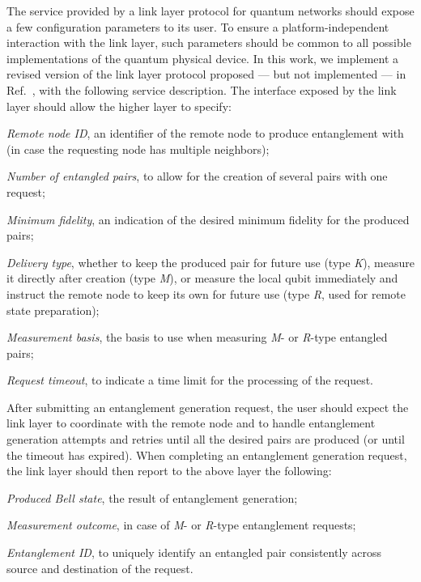 The service provided by a link layer protocol for quantum networks should expose a few configuration
parameters to its user. To ensure a platform-independent interaction with the link layer, such
parameters should be common to all possible implementations of the quantum physical device. In this
work, we implement a revised version of the link layer protocol proposed --- but not implemented ---
in Ref.~\cite{dahlberg_2019_egp}, with the following service description. The interface exposed by
the link layer should allow the higher layer to specify:
%
\begin{inlinelist}
    \item \emph{Remote node ID}, an identifier of the remote node to produce entanglement with (in
          case the requesting node has multiple neighbors);
    \item \emph{Number of entangled pairs}, to allow for the creation of several pairs with one
          request;
    \item \emph{Minimum fidelity}, an indication of the desired minimum fidelity for the produced
          pairs;
    \item \emph{Delivery type}, whether to keep the produced pair for future use (type \emph{K}),
          measure it directly after creation (type \emph{M}), or measure the local qubit immediately
          and instruct the remote node to keep its own for future use (type \emph{R}, used for
          remote state preparation);
    \item \emph{Measurement basis}, the basis to use when measuring \emph{M}- or \emph{R}-type
          entangled pairs;
    \item \emph{Request timeout}, to indicate a time limit for the processing of the request.
\end{inlinelist}
After submitting an entanglement generation request, the user should expect the link layer to
coordinate with the remote node and to handle entanglement generation attempts and retries until all
the desired pairs are produced (or until the timeout has expired). When completing an entanglement
generation request, the link layer should then report to the above layer the following:
%
\begin{inlinelist}
    \item \emph{Produced Bell state}, the result of entanglement generation;
    \item \emph{Measurement outcome}, in case of \emph{M}- or \emph{R}-type entanglement requests;
    \item \emph{Entanglement ID}, to uniquely identify an entangled pair consistently across source
          and destination of the request.
\end{inlinelist}

